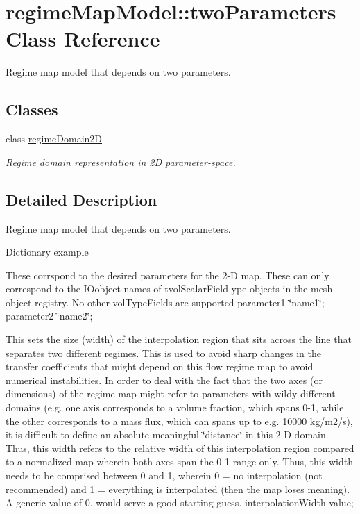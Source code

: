 \hypertarget{classFoam_1_1regimeMapModel_1_1twoParameters}{}\section{regime\+Map\+Model\+:\+:two\+Parameters Class Reference}
\label{classFoam_1_1regimeMapModel_1_1twoParameters}


Regime map model that depends on two parameters.  


\subsection*{Classes}
\begin{DoxyCompactItemize}
\item 
class \hyperlink{classFoam_1_1regimeMapModel_1_1twoParameters_1_1regimeDomain2D}{regime\+Domain2D}
\begin{DoxyCompactList}\small\item\em Regime domain representation in 2D parameter-\/space. \end{DoxyCompactList}\end{DoxyCompactItemize}


\subsection{Detailed Description}
Regime map model that depends on two parameters. 

\label{_Description}%
 Dictionary example \begin{DoxyVerb}regimeMaps
{
    "mapName"
    {
        type twoParameters;
\end{DoxyVerb}


These corrspond to the desired parameters for the 2-\/D map. These can only correspond to the I\+Oobject names of tvol\+Scalar\+Field ype objects in the mesh object registry. No other vol\+Type\+Fields are supported parameter1 \char`\"{}name1\char`\"{}; parameter2 \char`\"{}name2\char`\"{};

This sets the size (width) of the interpolation region that sits across the line that separates two different regimes. This is used to avoid sharp changes in the transfer coefficients that might depend on this flow regime map to avoid numerical instabilities. In order to deal with the fact that the two axes (or dimensions) of the regime map might refer to parameters with wildy different domains (e.\+g. one axis corresponds to a volume fraction, which spans 0-\/1, while the other corresponds to a mass flux, which can spans up to e.\+g. 10000 kg/m2/s), it is difficult to define an absolute meaningful \char`\"{}distance\char`\"{} in this 2-\/D domain. Thus, this width refers to the relative width of this interpolation region compared to a normalized map wherein both axes span the 0-\/1 range only. Thus, this width needs to be comprised between 0 and 1, wherein 0 = no interpolation (not recommended) and 1 = everything is interpolated (then the map loses meaning). A generic value of 0. would serve a good starting guess. interpolation\+Width value;


